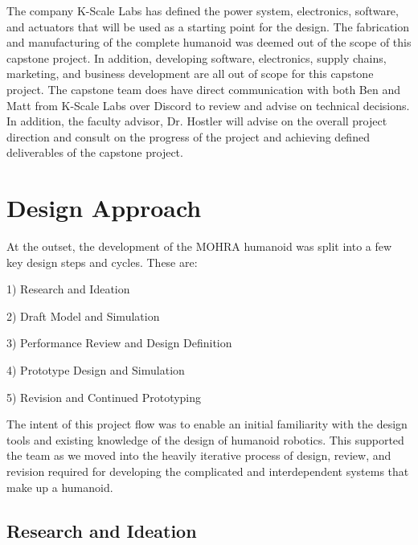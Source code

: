 \documentclass{article}
\begin{document}
The company K-Scale Labs has defined the power system, electronics, software, and actuators that will be used as a starting point for the design. The fabrication and manufacturing of the complete humanoid was deemed out of the scope of this capstone project. In addition, developing software, electronics, supply chains, marketing, and business development are all out of scope for this capstone project. The capstone team does have direct communication with both Ben and Matt from K-Scale Labs over Discord to review and advise on technical decisions. In addition, the faculty advisor, Dr. Hostler will advise on the overall project direction and consult on the progress of the project and achieving defined deliverables of the capstone project. 


\section{Design Approach}

At the outset, the development of the MOHRA humanoid was split into a few key design steps and cycles. These are:

1) Research and Ideation

2) Draft Model and Simulation

3) Performance Review and Design Definition

4) Prototype Design and Simulation

5) Revision and Continued Prototyping


The intent of this project flow was to enable an initial familiarity with the design tools and existing knowledge of the design of humanoid robotics. This supported the team as we moved into the heavily iterative process of design, review, and revision required for developing the complicated and interdependent systems that make up a humanoid.

\subsection{Research and Ideation}
\end{document}
